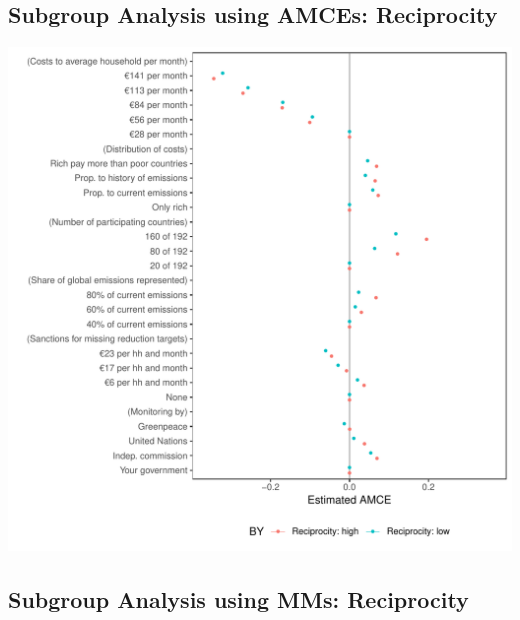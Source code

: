 \documentclass[a4paper,12pt]{article}\usepackage[]{graphicx}\usepackage[]{color}
\makeatletter
\def\maxwidth{ %
  \ifdim\Gin@nat@width>\linewidth
    \linewidth
  \else
    \Gin@nat@width
  \fi
}
\newenvironment{knitrout}{}{} %
\makeatother
\begin{document}
\clearpage

\clearpage

\subsection{Subgroup Analysis using AMCEs: Reciprocity}

\begin{knitrout}
\color{fgcolor}
\includegraphics[width=\maxwidth]{figure/bechtel_subgroup_amce_reciprocity-1} 

\end{knitrout}

\clearpage

\clearpage

\subsection{Subgroup Analysis using MMs: Reciprocity}
\end{document}
